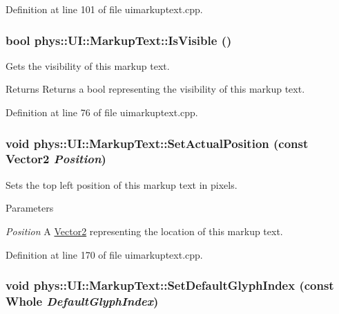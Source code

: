 Definition at line 101 of file uimarkuptext.cpp.

\hypertarget{classphys_1_1UI_1_1MarkupText_a17873359c7387926c7e759665ad4312d}{
\subsubsection[{IsVisible}]{\setlength{\rightskip}{0pt plus 5cm}bool phys::UI::MarkupText::IsVisible ()}}
\label{d7/d23/classphys_1_1UI_1_1MarkupText_a17873359c7387926c7e759665ad4312d}


Gets the visibility of this markup text. 

\begin{DoxyReturn}{Returns}
Returns a bool representing the visibility of this markup text. 
\end{DoxyReturn}


Definition at line 76 of file uimarkuptext.cpp.

\hypertarget{classphys_1_1UI_1_1MarkupText_a0b6e052e1b592b66bc7fd923f975b7ef}{
\subsubsection[{SetActualPosition}]{\setlength{\rightskip}{0pt plus 5cm}void phys::UI::MarkupText::SetActualPosition (const {\bf Vector2} {\em Position})}}
\label{d7/d23/classphys_1_1UI_1_1MarkupText_a0b6e052e1b592b66bc7fd923f975b7ef}


Sets the top left position of this markup text in pixels. 


\begin{DoxyParams}{Parameters}
\item[{\em Position}]A \hyperlink{classphys_1_1Vector2}{Vector2} representing the location of this markup text. \end{DoxyParams}


Definition at line 170 of file uimarkuptext.cpp.

\hypertarget{classphys_1_1UI_1_1MarkupText_a6f0b087fca1b75a5005652ccd31a77a1}{
\subsubsection[{SetDefaultGlyphIndex}]{\setlength{\rightskip}{0pt plus 5cm}void phys::UI::MarkupText::SetDefaultGlyphIndex (const {\bf Whole} {\em DefaultGlyphIndex})}}
\label{d7/d23/classphys_1_1UI_1_1MarkupText_a6f0b087fca1b75a5005652ccd31a77a1}


